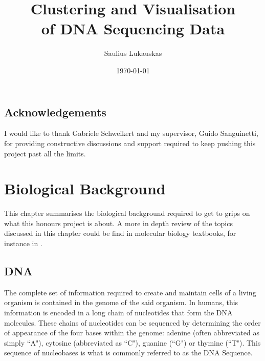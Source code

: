 \documentclass[parskip]{cs4rep}
\begin{document}
\title{Clustering and Visualisation\\ of DNA Sequencing Data}

\author{Saulius Lukauskas}


\date{\today}


\maketitle

\section*{Acknowledgements}
I would like to thank Gabriele Schweikert and my supervisor, Guido Sanguinetti, for providing constructive discussions and support required to keep pushing this project past all the limits.

\tableofcontents



\chapter{Biological Background}
This chapter summarises the biological background required to get to grips on what this honours project is about. 
A more in depth review of the topics discussed in this chapter could be find in molecular biology textbooks, for instance in \cite{Alberts:2002te}.

\section{DNA}

The complete set of information required to create and maintain cells of a
living organism is contained in the genome of the said organism. In humans, this
information is encoded in a long chain of nucleotides that form the DNA molecules. 
These chains of nucleotides can be sequenced by determining the order of appearance
of the four bases within the genome: adenine (often abbreviated as simply ``A"), cytosine (abbreviated as ``C"),
guanine (``G") or thymine (``T").
This sequence of nucleobases is what is commonly referred to as the DNA Sequence. 
\end{document}

